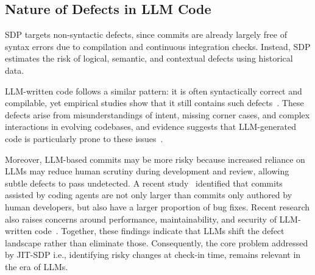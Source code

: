 \documentclass[\main/thesis.tex]{subfiles}
\begin{document}
\subsection{Nature of Defects in LLM Code} 
%
%
%

SDP targets non-syntactic defects, since commits are already largely free of syntax errors due to compilation and continuous integration checks. Instead, SDP estimates the risk of logical, semantic, and contextual defects using historical data.

LLM-written code follows a similar pattern: it is often syntactically correct and compilable, yet empirical studies show that it still contains such defects~\cite{tambon2025bugs}. These defects arise from misunderstandings of intent, missing corner cases, and complex interactions in evolving codebases, and evidence suggests that LLM-generated code is particularly prone to these issues~\cite{dou2026wrong}.

Moreover, LLM-based commits may be more risky because increased reliance on LLMs may reduce human scrutiny during development and review, allowing subtle defects to pass undetected. A recent study~\cite{robbes2026agentic} identified that commits assisted by coding agents are not only larger than commits
only authored by human developers, but also have a larger proportion of bug fixes. Recent research also raises concerns around performance, maintainability, and security of LLM-written code~\cite{tihanyi2025secure}. Together, these findings indicate that LLMs shift the defect landscape rather than eliminate those. Consequently, the core problem addressed by JIT-SDP i.e., identifying risky changes at check-in time, remains relevant in the era of LLMs.
\end{document}
